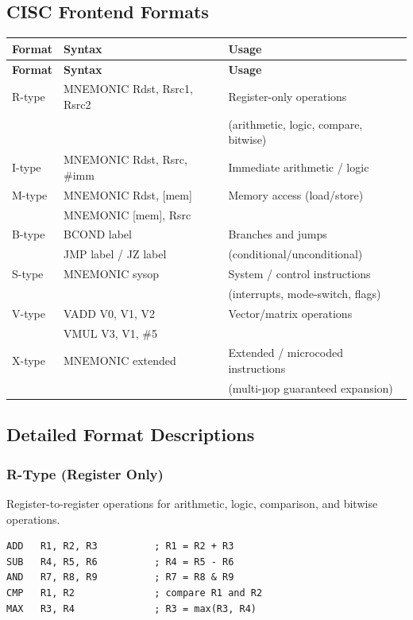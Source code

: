\documentclass[12pt]{article}
\begin{document}
\subsection{CISC Frontend Formats}

\begin{longtable}{@{}lll@{}}
\toprule
\textbf{Format} & \textbf{Syntax} & \textbf{Usage} \\ \midrule
\endfirsthead
\toprule
\textbf{Format} & \textbf{Syntax} & \textbf{Usage} \\ \midrule
\endhead
R-type & MNEMONIC Rdst, Rsrc1, Rsrc2 & Register-only operations \\
 &  & (arithmetic, logic, compare, bitwise) \\
I-type & MNEMONIC Rdst, Rsrc, \#imm & Immediate arithmetic / logic \\
M-type & MNEMONIC Rdst, [mem] & Memory access (load/store) \\
 & MNEMONIC [mem], Rsrc & \\
B-type & BCOND label & Branches and jumps \\
 & JMP label / JZ label & (conditional/unconditional) \\
S-type & MNEMONIC sysop & System / control instructions \\
 &  & (interrupts, mode-switch, flags) \\
V-type & VADD V0, V1, V2 & Vector/matrix operations \\
 & VMUL V3, V1, \#5 & \\
X-type & MNEMONIC extended & Extended / microcoded instructions \\
 &  & (multi-µop guaranteed expansion) \\ \bottomrule
\end{longtable}

\subsection{Detailed Format Descriptions}

\subsubsection{R-Type (Register Only)}

Register-to-register operations for arithmetic, logic, comparison, and bitwise operations.

\begin{lstlisting}
ADD   R1, R2, R3          ; R1 = R2 + R3
SUB   R4, R5, R6          ; R4 = R5 - R6
AND   R7, R8, R9          ; R7 = R8 & R9
CMP   R1, R2              ; compare R1 and R2
MAX   R3, R4              ; R3 = max(R3, R4)
\end{lstlisting}
\end{document}
